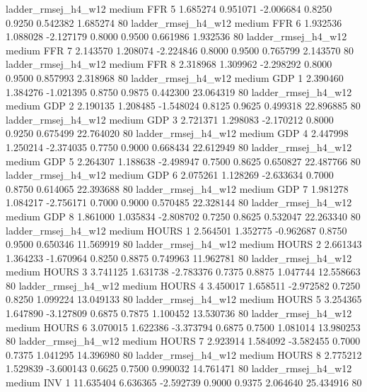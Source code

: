    ladder_rmsej_h4_w12     medium      FFR                 5  1.685274 0.951071 -2.006684 0.8250 0.9250  0.542382    1.685274 80
   ladder_rmsej_h4_w12     medium      FFR                 6  1.932536 1.088028 -2.127179 0.8000 0.9500  0.661986    1.932536 80
   ladder_rmsej_h4_w12     medium      FFR                 7  2.143570 1.208074 -2.224846 0.8000 0.9500  0.765799    2.143570 80
   ladder_rmsej_h4_w12     medium      FFR                 8  2.318968 1.309962 -2.298292 0.8000 0.9500  0.857993    2.318968 80
   ladder_rmsej_h4_w12     medium      GDP                 1  2.390460 1.384276 -1.021395 0.8750 0.9875  0.442300   23.064319 80
   ladder_rmsej_h4_w12     medium      GDP                 2  2.190135 1.208485 -1.548024 0.8125 0.9625  0.499318   22.896885 80
   ladder_rmsej_h4_w12     medium      GDP                 3  2.721371 1.298083 -2.170212 0.8000 0.9250  0.675499   22.764020 80
   ladder_rmsej_h4_w12     medium      GDP                 4  2.447998 1.250214 -2.374035 0.7750 0.9000  0.668434   22.612949 80
   ladder_rmsej_h4_w12     medium      GDP                 5  2.264307 1.188638 -2.498947 0.7500 0.8625  0.650827   22.487766 80
   ladder_rmsej_h4_w12     medium      GDP                 6  2.075261 1.128269 -2.633634 0.7000 0.8750  0.614065   22.393688 80
   ladder_rmsej_h4_w12     medium      GDP                 7  1.981278 1.084217 -2.756171 0.7000 0.9000  0.570485   22.328144 80
   ladder_rmsej_h4_w12     medium      GDP                 8  1.861000 1.035834 -2.808702 0.7250 0.8625  0.532047   22.263340 80
   ladder_rmsej_h4_w12     medium    HOURS                 1  2.564501 1.352775 -0.962687 0.8750 0.9500  0.650346   11.569919 80
   ladder_rmsej_h4_w12     medium    HOURS                 2  2.661343 1.364233 -1.670964 0.8250 0.8875  0.749963   11.962781 80
   ladder_rmsej_h4_w12     medium    HOURS                 3  3.741125 1.631738 -2.783376 0.7375 0.8875  1.047744   12.558663 80
   ladder_rmsej_h4_w12     medium    HOURS                 4  3.450017 1.658511 -2.972582 0.7250 0.8250  1.099224   13.049133 80
   ladder_rmsej_h4_w12     medium    HOURS                 5  3.254365 1.647890 -3.127809 0.6875 0.7875  1.100452   13.530736 80
   ladder_rmsej_h4_w12     medium    HOURS                 6  3.070015 1.622386 -3.373794 0.6875 0.7500  1.081014   13.980253 80
   ladder_rmsej_h4_w12     medium    HOURS                 7  2.923914 1.584092 -3.582455 0.7000 0.7375  1.041295   14.396980 80
   ladder_rmsej_h4_w12     medium    HOURS                 8  2.775212 1.529839 -3.600143 0.6625 0.7500  0.990032   14.761471 80
   ladder_rmsej_h4_w12     medium      INV                 1 11.635404 6.636365 -2.592739 0.9000 0.9375  2.064640   25.434916 80

